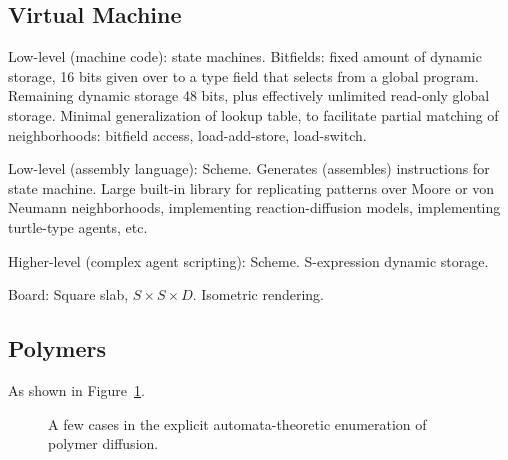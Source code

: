 \documentclass{acm_proc_article-sp}
\begin{document}
\subsection{Virtual Machine}

Low-level (machine code):
state machines.
Bitfields: fixed amount of dynamic storage, 16 bits given over to a type field that selects from a global program.
Remaining dynamic storage 48 bits, plus effectively unlimited read-only global storage.
Minimal generalization of lookup table, to facilitate partial matching of neighborhoods:
bitfield access, load-add-store, load-switch.

Low-level (assembly language):
Scheme. Generates (assembles) instructions for state machine.
Large built-in library for replicating patterns over Moore or von Neumann neighborhoods,
implementing reaction-diffusion models, implementing turtle-type agents, etc.

Higher-level (complex agent scripting):
Scheme. S-expression dynamic storage.

Board:
Square slab, $S \times S \times D$.
Isometric rendering.


\subsection{Polymers}

\cite{DoiEdwards}

As shown in Figure~\ref{fig:polymer}.

\begin{figure}
\caption{
\label{fig:polymer}
A few cases in the explicit automata-theoretic enumeration of polymer diffusion.
}
\end{figure}
\end{document}
